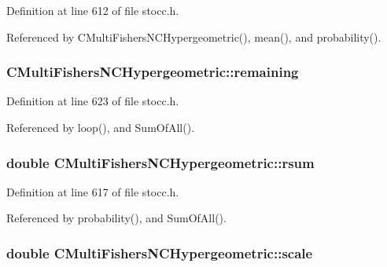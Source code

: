 Definition at line 612 of file stocc.\-h.



Referenced by C\-Multi\-Fishers\-N\-C\-Hypergeometric(), mean(), and probability().

\subsubsection[{remaining}]{ C\-Multi\-Fishers\-N\-C\-Hypergeometric\-::remaining\hspace{0.3cm}{\ttfamily [protected]}}\label{class_c_multi_fishers_n_c_hypergeometric_a60858d0485b1fc02c218264b3c31e648}


Definition at line 623 of file stocc.\-h.



Referenced by loop(), and Sum\-Of\-All().

\subsubsection[{rsum}]{\setlength{\rightskip}{0pt plus 5cm}double C\-Multi\-Fishers\-N\-C\-Hypergeometric\-::rsum\hspace{0.3cm}{\ttfamily [protected]}}\label{class_c_multi_fishers_n_c_hypergeometric_a8b555f4cd4f89702fc4b7d8947972637}


Definition at line 617 of file stocc.\-h.



Referenced by probability(), and Sum\-Of\-All().

\subsubsection[{scale}]{\setlength{\rightskip}{0pt plus 5cm}double C\-Multi\-Fishers\-N\-C\-Hypergeometric\-::scale\hspace{0.3cm}{\ttfamily [protected]}}\label{class_c_multi_fishers_n_c_hypergeometric_a6e4e45d375038e86f679cad63ac9e749}


